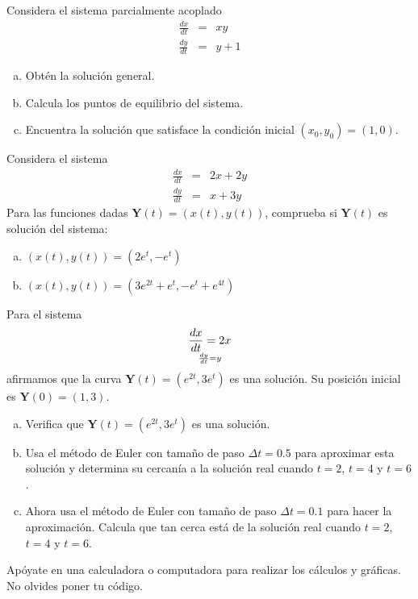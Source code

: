 \documentclass[12pt]{exam}
\begin{document}
\begin{questions}
     \question%
     Considera el sistema parcialmente acoplado $$\begin{array}{rcl}
          \frac{dx}{dt}&=&xy  \\
          \frac{dy}{dt}&=&y+1 
     \end{array}$$
     \begin{enumerate}[a)]
         \item Obtén la solución general.
         \item Calcula los puntos de equilibrio del sistema.
         \item Encuentra la solución que satisface la condición inicial $(x_0,y_0)=(1,0)$.
     \end{enumerate}


     \question%
     Considera el sistema $$\begin{array}{rcl}
          \frac{dx}{dt}&=&2x+2y  \\
          \frac{dy}{dt}&=&x+3y 
     \end{array}$$
     Para las funciones dadas $\mathbf{Y}(t)=(x(t),y(t))$, comprueba si $\mathbf{Y}(t)$ es solución del sistema:
     \begin{enumerate}[a)]
         \item $(x(t),y(t))=(2e^t,-e^t)$
         \item $(x(t),y(t))=(3e^{2t}+e^t,-e^t+e^{4t})$
     \end{enumerate}



     \question%
     Para el sistema $$\frac{dx}{dt}=2x\atop \frac{dy}{dt}=y$$
     afirmamos que la curva $\mathbf{Y}(t)=(e^{2t},3e^t)$ es una solución. Su posición inicial es $\mathbf{Y}(0)=(1,3)$.
     \begin{enumerate}[a)]
         \item Verifica que $\mathbf{Y}(t)=(e^{2t},3e^t)$ es una solución.
         \item Usa el método de Euler con tamaño de paso $\Delta t=0.5$ para aproximar esta solución y determina su cercanía a la solución real cuando $t=2$, $t=4$ y $t=6$.
         \item Ahora usa el método de Euler con tamaño de paso $\Delta t=0.1$ para hacer la aproximación. Calcula que tan cerca está de la solución real cuando $t=2$, $t=4$ y $t=6$.
     \end{enumerate}
     Apóyate en una calculadora o computadora para realizar los cálculos y gráficas. No olvides poner tu código.


     
     
     
        \end{questions}
\end{document}

